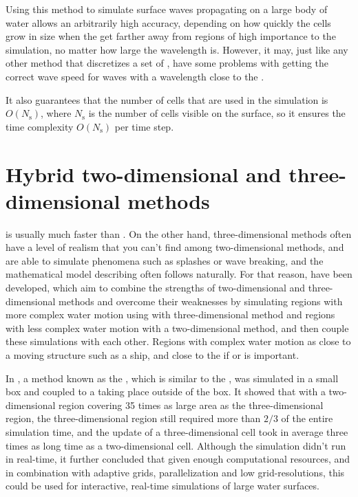 Using this method to simulate surface waves propagating on a large body of water allows an arbitrarily high accuracy, depending on how quickly the cells grow in size when the get farther away from regions of high importance to the simulation, no matter how large the wavelength is. However, it may, just like any other method that discretizes a set of \PDEs, have some problems with getting the correct wave speed for waves with a wavelength close to the .

It also guarantees that the number of cells that are used in the simulation is $O(N_{\text{s}})$, where $N_{\text{s}}$ is the number of cells visible on the surface, so it ensures the time complexity $O(N_{\text{s}})$ per time step.

\section{Hybrid two-dimensional and three-dimensional methods}

 is usually much faster than . On the other hand, three-dimensional methods often have a level of realism that you can't find among two-dimensional methods, and are able to simulate phenomena such as splashes or wave breaking, and the mathematical model describing \FSI often follows naturally. For that reason,  have been developed, which aim to combine the strengths of two-dimensional and three-dimensional methods and overcome their weaknesses by simulating regions with more complex water motion using with three-dimensional method and regions with less complex water motion with a two-dimensional method, and then couple these simulations with each other. Regions with complex water motion as close to a moving structure such as a ship, and close to the \shoreline if  or  is important.

In \citep{Thurey2006}, a method known as the , which is similar to the \FVM, was simulated in a small box and coupled to a \SWS taking place outside of the box. It showed that with a two-dimensional region covering 35 times as large area as the three-dimensional region, the three-dimensional region still required more than $2/3$ of the entire simulation time, and the update of a three-dimensional cell took in average three times as long time as a two-dimensional cell. Although the simulation didn't run in real-time, it further concluded that given enough computational resources, and in combination with adaptive grids, parallelization and low grid-resolutions, this could be used for interactive, real-time simulations of large water surfaces.

